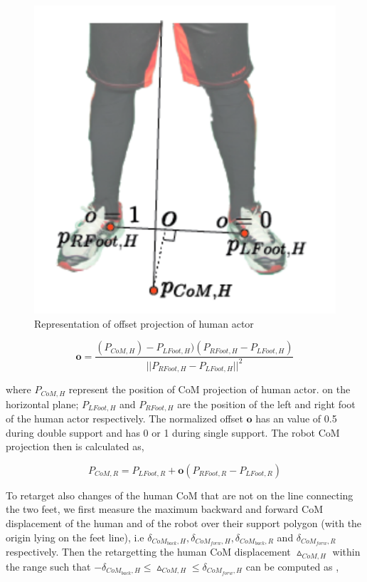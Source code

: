 \begin{figure}[h!]
    \centering
    \includegraphics[scale=0.4]{images/human-com-track.png}\hfill
    \caption{Representation of offset projection of human actor \cite{penco:hal-01895145}}\hfill
    \label{fig: human-com-offset}
\end{figure}

\begin{equation}
    \mathbf{o} = \frac{(P_{CoM, H}) - P_{LFoot, H})(P_{RFoot, H} - P_{LFoot, H})}{||P_{RFoot, H} - P_{LFoot, H}||^2}
    \label{eq: human-com-offset}
\end{equation}

where $P_{CoM, H}$ represent the position of CoM projection of human actor. on the horizontal plane; $P_{LFoot, H}$ and $P_{RFoot, H}$ are the position of 
the left and right foot of the human actor respectively. The normalized offset $\mathbf{o}$ has an value of 0.5 during double support and has 0 or 1 
during single support. The robot CoM projection then is calculated as,

\begin{equation}
    P_{CoM, R} = P_{LFoot, R} + \mathbf{o}(P_{RFoot, R} - P_{LFoot, R})
    \label{eq: robot-com-1}
\end{equation}

To retarget also changes of the human CoM that are not on the line connecting the two feet, we first measure the maximum backward and forward CoM displacement
 of the human and of the robot over their support polygon (with the origin lying on the feet line), i.e $\delta_{CoM_{back}, H}, \delta_{CoM_{forw}, H}, \delta_{CoM_{back}, R}$ and 
$\delta_{CoM_{forw}, R}$ respectively. Then the retargetting the human CoM displacement $\vartriangle_{CoM, H}$ within the range such that $-\delta_{CoM_{back}, H} \leq 
 \vartriangle_{CoM, H} \leq \delta_{CoM_{forw}, H}$ can be computed as ,


